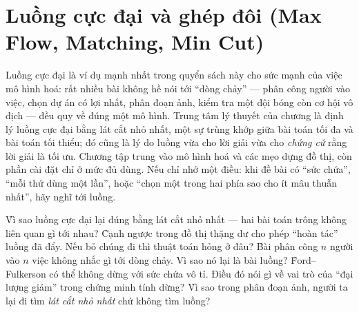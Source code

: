 \documentclass[../../algorithm.tex]{subfiles}
\begin{document}
\chapter{Luồng cực đại và ghép đôi (Max Flow, Matching, Min Cut)}

\begin{tomtat}
Luồng cực đại là ví dụ mạnh nhất trong quyển sách này cho sức mạnh của việc mô hình hoá: rất nhiều bài không hề nói tới ``dòng chảy'' --- phân công người vào việc, chọn dự án có lợi nhất, phân đoạn ảnh, kiểm tra một đội bóng còn cơ hội vô địch --- đều quy về đúng một mô hình. Trung tâm lý thuyết của chương là định lý luồng cực đại bằng lát cắt nhỏ nhất, một sự trùng khớp giữa bài toán tối đa và bài toán tối thiểu; đó cũng là lý do luồng vừa cho lời giải vừa cho \emph{chứng cứ} rằng lời giải là tối ưu. Chương tập trung vào mô hình hoá và các mẹo dựng đồ thị, còn phần cài đặt chỉ ở mức đủ dùng. Nếu chỉ nhớ một điều: khi đề bài có ``sức chứa'', ``mỗi thứ dùng một lần'', hoặc ``chọn một trong hai phía sao cho ít mâu thuẫn nhất'', hãy nghĩ tới luồng.
\end{tomtat}

\begin{nentang}
\end{nentang}

\begin{khoigoi}
\h{Vì sao luồng cực đại lại đúng bằng lát cắt nhỏ nhất --- hai bài toán trông không liên quan gì tới nhau?}
\h{Cạnh ngược trong đồ thị thặng dư cho phép ``hoàn tác'' luồng đã đẩy. Nếu bỏ chúng đi thì thuật toán hỏng ở đâu?}
\h{Bài phân công \(n\) người vào \(n\) việc không nhắc gì tới dòng chảy. Vì sao nó lại là bài luồng?}
\h{Ford--Fulkerson có thể không dừng với sức chứa vô tỉ. Điều đó nói gì về vai trò của ``đại lượng giảm'' trong chứng minh tính dừng?}
\h{Vì sao trong phân đoạn ảnh, người ta lại đi tìm \emph{lát cắt nhỏ nhất} chứ không tìm luồng?}
\end{khoigoi}
\end{document}
